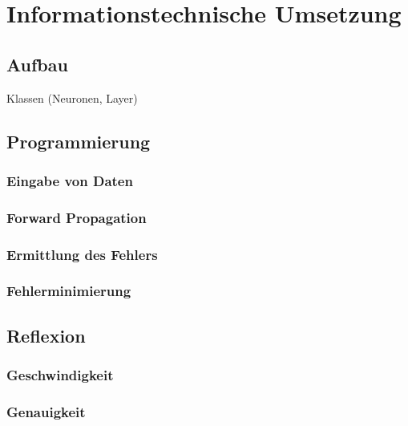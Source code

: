 \section{Informationstechnische Umsetzung}

\subsection{Aufbau}
Klassen (Neuronen, Layer)

\subsection{Programmierung}

\subsubsection{Eingabe von Daten}

\subsubsection{Forward Propagation}

\subsubsection{Ermittlung des Fehlers}

\subsubsection{Fehlerminimierung}

\subsection{Reflexion}

\subsubsection{Geschwindigkeit}

\subsubsection{Genauigkeit}

